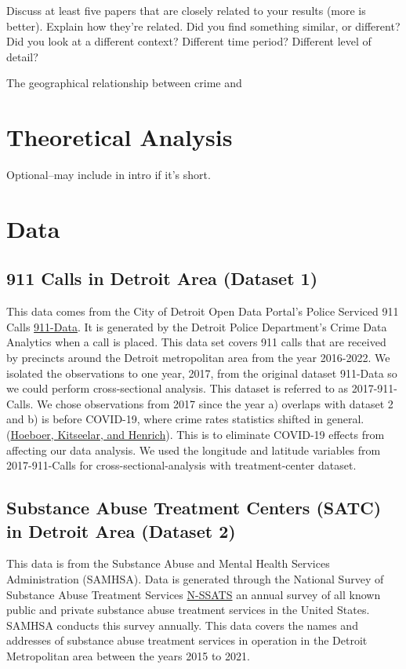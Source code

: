 \documentclass[12pt]{article}
\begin{document}
Discuss at least five papers that are closely related to your results (more is better). Explain how they're related. Did you find something similar, or different? Did you look at a different context? Different time period? Different level of detail?

The geographical relationship between crime and 

\section{Theoretical Analysis}
\label{sec:theory}
Optional--may include in intro if it's short.


\section{Data}
\label{sec:data}

\subsection{911 Calls in Detroit Area (Dataset 1)}

This data comes from the City of Detroit Open Data Portal's Police Serviced 911 Calls  \href{https://data.detroitmi.gov/datasets/detroitmi::police-serviced-911-calls/about}{911-Data}. It is generated by the Detroit Police Department's Crime Data Analytics when a call is placed. This data set covers 911 calls that are received by precincts around the Detroit metropolitan area from the year 2016-2022. We isolated the observations to one year, 2017, from the original dataset 911-Data so we could perform cross-sectional analysis. This dataset is referred to as 2017-911-Calls. We chose observations from 2017 since the year a) overlaps with dataset 2 and b) is before COVID-19, where crime rates statistics shifted in general. (\href{https://doi.org/10.1007/s12103-023-09746-4}{Hoeboer, Kitseelar, and Henrich}). This is to eliminate COVID-19 effects from affecting our data analysis. We used the longitude and latitude variables from 2017-911-Calls for cross-sectional-analysis with treatment-center dataset.

\subsection{Substance Abuse Treatment Centers (SATC) in Detroit Area (Dataset 2)}

This data is from the Substance Abuse and Mental Health Services Administration (SAMHSA). Data is generated through the National Survey of Substance Abuse Treatment Services \href{https://www.samhsa.gov/data/data-we-collect/n-ssats-national-survey-substance-abuse-treatment-services}{N-SSATS} an annual survey of all known public and private substance abuse treatment services in the United States. SAMHSA conducts this survey annually. This data covers the names and addresses of substance abuse treatment services in operation in the Detroit Metropolitan area between the years 2015 to 2021. 
\end{document}
